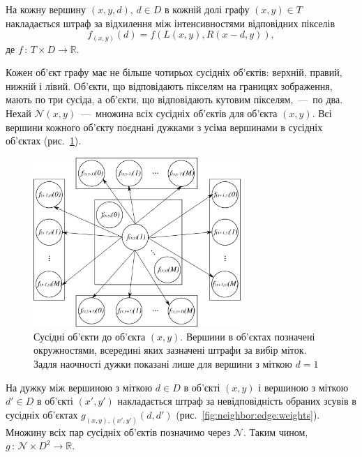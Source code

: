 На кожну вершину $\left(x, y, d \right), \, d \in D$ в кожній долі графу
$\left(x, y \right) \in T$
накладається штраф за відхилення між інтенсивностями відповідних пікселів
\begin{equation} \label{eq:penalty:vertex}
    f_{\left(x, y \right)} \left(d \right) =
    f \left(
        L \left(x, y \right),
        R \left(x - d, y \right)
    \right),
\end{equation}
де $f \, : \, T \times D \to \mathbb{R}$.

Кожен об'єкт графу має не більше чотирьох сусідніх об'єктів: верхній, правий,
нижній і лівий.
Об'єкти, що відповідають пікселям на границях зображення, мають по три сусіда,
а об'єкти, що відповідають кутовим пікселям,~---~по два.
Нехай $\mathcal{N} \left( x, y \right) $~---~множина всіх
сусідніх об'єктів для об'єкта $\left( x, y \right)$.
Всі вершини кожного об'єкту поєднані дужками з усіма
вершинами в сусідніх об'єктах (рис.~\ref{fig:neighbors}).

\begin{figure}[h]
  \centering
  \includegraphics[width=0.7\textwidth]{images/neighbors}
  \caption{Сусідні об'єкти до об'єкта $\left(x, y \right)$.
           Вершини в об'єктах позначені окружностями,
           всередині яких зазначені штрафи за вибір міток.
           Задля наочності дужки показані лише для вершини з міткою $d = 1$}
  \label{fig:neighbors}
\end{figure}

На дужку між вершиною з міткою $d \in D$ в об'єкті $\left(x, y \right)$
і вершиною з міткою $d' \in D$ в об'єкті $\left(x', y' \right)$
накладається штраф за невідповідність обраних зсувів в сусідніх об'єктах
$g_{\left(x, y \right), \left(x', y' \right)} \left(d, d' \right)$
(рис.~\ref{fig:neighbor:edge:weights}).
Множину всіх пар сусідніх об'єктів позначимо через $\mathcal{N}$.
Таким чином, $g \, : \, \mathcal{N} \times D^2 \to \mathbb{R}$.

